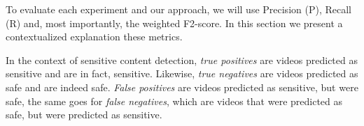 
To evaluate each experiment and our approach, we will use Precision (P), Recall (R) and, most importantly, the weighted F2-score. In this section we present a contextualized explanation these metrics.




In the context of sensitive content detection, \textit{true positives} are videos predicted as sensitive and are in fact, sensitive. Likewise, \textit{true negatives} are videos predicted as safe and are indeed safe. \textit{False positives} are videos predicted as sensitive, but were safe, the same goes for \textit{false negatives}, which are videos that were predicted as safe, but were predicted as sensitive.

